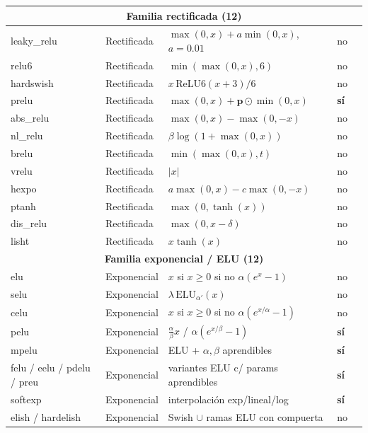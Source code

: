 \begin{longtable}{p{2.6cm}p{1.4cm}p{5.2cm}p{0.9cm}p{2.0cm}}
\multicolumn{5}{c}{\textbf{Familia rectificada (12)}} \\
\midrule
leaky\_relu & Rectificada & $\max(0,x)+a\min(0,x)$, $a{=}0.01$ & no & \citep{maas2013leakyrelu} \\
relu6 & Rectificada & $\min(\max(0,x),6)$ & no & \citep{howard2019hardswish} \\
hardswish & Rectificada & $x\,\text{ReLU6}(x{+}3)/6$ & no & \citep{howard2019hardswish} \\
prelu & Rectificada & $\max(0,x)+\mathbf{p}\odot\min(0,x)$ & \textbf{sí} & \citep{he2015prelu} \\
abs\_relu & Rectificada & $\max(0,x)-\max(0,-x)$ & no & \citep{dubey2021activations} \\
nl\_relu & Rectificada & $\beta\log(1+\max(0,x))$ & no & \citep{dubey2021activations} \\
brelu & Rectificada & $\min(\max(0,x),t)$ & no & \citep{dubey2021activations} \\
vrelu & Rectificada & $|x|$ & no & \citep{dubey2021activations} \\
hexpo & Rectificada & $a\max(0,x)-c\max(0,-x)$ & no & \citep{dubey2021activations} \\
ptanh & Rectificada & $\max(0,\tanh(x))$ & no & \citep{dubey2021activations} \\
dis\_relu & Rectificada & $\max(0,x-\delta)$ & no & \citep{dubey2021activations} \\
lisht & Rectificada & $x\tanh(x)$ & no & \citep{roy2019lisht} \\
\midrule

\multicolumn{5}{c}{\textbf{Familia exponencial / ELU (12)}} \\
\midrule
elu & Exponencial & $x$ si $x\ge0$ si no $\alpha(e^x{-}1)$ & no & \citep{clevert2016elu} \\
selu & Exponencial & $\lambda\,\text{ELU}_{\alpha'}(x)$ & no & \citep{klambauer2017selu} \\
celu & Exponencial & $x$ si $x\ge0$ si no $\alpha(e^{x/\alpha}{-}1)$ & no & \citep{barron2017celu} \\
pelu & Exponencial & $\tfrac{\alpha}{\beta}x$ / $\alpha(e^{x/\beta}{-}1)$ & \textbf{sí} & \citep{dubey2021activations} \\
mpelu & Exponencial & ELU + $\alpha,\beta$ aprendibles & \textbf{sí} & \citep{dubey2021activations} \\
felu / eelu / pdelu / preu & Exponencial & variantes ELU c/ params aprendibles & \textbf{sí} & \citep{dubey2021activations} \\
softexp & Exponencial & interpolación exp/lineal/log & \textbf{sí} & \citep{dubey2021activations} \\
elish / hardelish & Exponencial & Swish $\cup$ ramas ELU con compuerta & no & \citep{basirat2019elish} \\
\midrule


\end{longtable}
